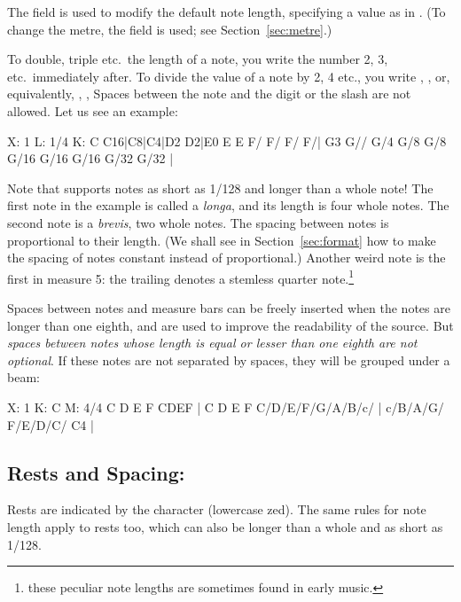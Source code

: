 \documentclass[a4paper,fullpage,12pt]{book}
\begin{document}
The  field is used to modify the default note length,
specifying a value as in . (To change the metre, the
 field is used; see Section~\ref{sec:metre}.)

To double, triple etc.\ the length of a note, you write the number 2,
3, etc.\ immediately after. To divide the value of a note by 2, 4
etc., you write , ,  or, equivalently,
\car{/}, \car{//}, \car{///}{\ldots} Spaces between the note and the
digit or the slash are not allowed. Let us see an example:

\begin{abcsource}
X: 1
L: 1/4
K: C
C16|C8|C4|D2 D2|E0 E E F/ F/ F/ F/|
G3 G// G/4 G/8 G/8 G/16 G/16 G/16 G/32 G/32 |
\end{abcsource}


Note that \abcm{} supports notes as short as 1/128 and longer than a
whole note! The first note in the example is called a \emph{longa},
and its length is four whole notes. The second note is a
\emph{brevis}, two whole notes. The spacing between notes is
proportional to their length. (We shall see in
Section~\ref{sec:format} how to make the spacing of notes constant
instead of proportional.) Another weird note is the first  in
measure 5: the trailing  denotes a stemless quarter
note.\footnote{these peculiar note lengths are sometimes found in
early music.}

Spaces between notes and measure bars can be freely inserted when the
notes are longer than one eighth, and are used to improve the
readability of the source. But \emph{spaces between notes whose length
is equal or lesser than one eighth are not optional}. If these notes
are not separated by spaces, they will be grouped under a beam:

\begin{abcsource}
X: 1
K: C
M: 4/4
% 
C D E F CDEF | C D E F C/D/E/F/G/A/B/c/ |
c/B/A/G/ F/E/D/C/ C4 |
\end{abcsource}



\subsection{Rests and Spacing: }
\label{sec:rests}

Rests are indicated by the character  (lowercase zed). The same
rules for note length apply to rests too, which can also be longer
than a whole and as short as 1/128.
\end{document}
